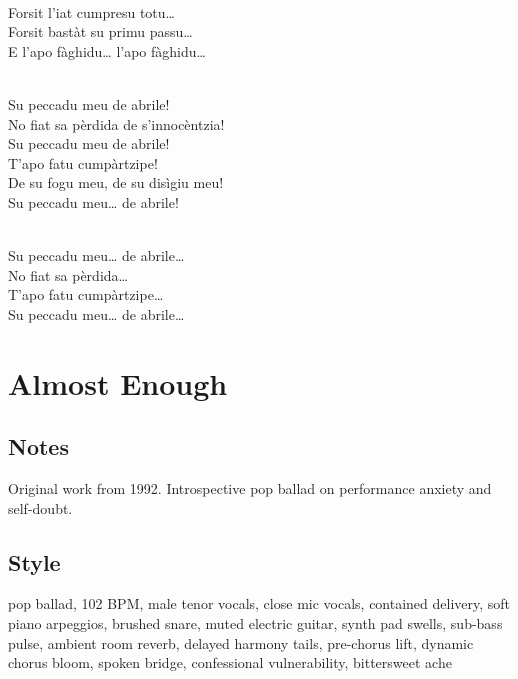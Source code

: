 \begin{lyrics}
\\
Forsit l’iat cumpresu totu…\\
Forsit bastàt su primu passu…\\
E l’apo fàghidu… l’apo fàghidu…

\\
Su peccadu meu de abrile!\\
No fiat sa pèrdida de s’innocèntzia!\\
Su peccadu meu de abrile!\\
T’apo fatu cumpàrtzipe!\\
De su fogu meu, de su disìgiu meu!\\
Su peccadu meu… de abrile!

\\
Su peccadu meu… de abrile…\\
No fiat sa pèrdida…\\
T’apo fatu cumpàrtzipe…\\
Su peccadu meu… de abrile…

\end{lyrics}

\section{Almost Enough}

\subsection{Notes}
Original work from 1992.
Introspective pop ballad on performance anxiety and self-doubt.

\subsection{Style}
pop ballad, 102 BPM, male tenor vocals, close mic vocals, contained delivery, soft piano arpeggios, brushed snare, muted electric guitar, synth pad swells, sub-bass pulse, ambient room reverb, delayed harmony tails, pre-chorus lift, dynamic chorus bloom, spoken bridge, confessional vulnerability, bittersweet ache

